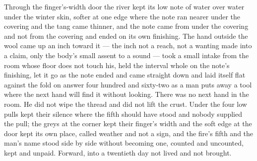 \scenebreak

Through the finger's-width door the river kept its low note of water over water under the winter skin, softer at one edge where the note ran nearer under the covering and the tang came thinner, and the note came from under the covering and not from the covering and ended on its own finishing. The hand outside the wool came up an inch toward it --- the inch not a reach, not a wanting made into a claim, only the body's small assent to a sound --- took a small intake from the room whose floor does not touch his, held the interval whole on the note's finishing, let it go as the note ended and came straight down and laid itself flat against the fold on answer four hundred and sixty-two as a man puts away a tool where the next hand will find it without looking. There was no next hand in the room. He did not wipe the thread and did not lift the crust. Under  the four low pulls kept their silence where the fifth should have stood and nobody supplied the pull; the greys at the corner kept their finger's width and the soft edge at the door kept its own place, called weather and not a sign, and the fire's fifth and the man's name stood side by side without becoming one, counted and uncounted, kept and unpaid. Forward, into a twentieth day not lived and not brought.
